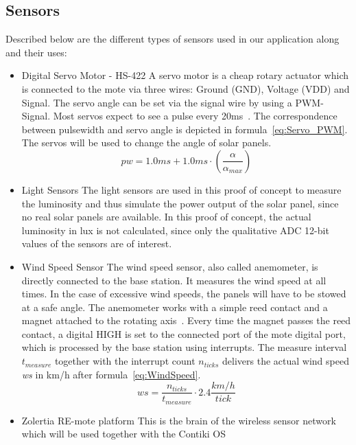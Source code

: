 \documentclass[conference]{IEEEtran}
\begin{document}
\subsection{Sensors}
Described below are the different types of sensors used in our application along and their uses:

\begin{itemize}
    \item Digital Servo Motor - HS-422\cite{servoMotor}\newline
        A servo motor is a cheap rotary actuator which is connected to the mote via three wires: Ground (GND), Voltage (VDD) and Signal. The servo angle can be set via the signal wire by using a PWM-Signal. Most servos expect to see a pulse every 20ms~\cite{howServoworks}. The correspondence between pulsewidth and servo angle is depicted in formula~\eqref{eq:Servo_PWM}. The servos will be used to change the angle of solar panels.
\begin{equation}\label{eq:Servo_PWM}
pw = 1.0ms + 1.0ms \cdot \left(\frac{\alpha}{\alpha_{max}}\right)
\end{equation}


    \item Light Sensors\cite{LightSensor}\newline
        The light sensors are used in this proof of concept to measure the luminosity and thus simulate the power output of the solar panel, since no real solar panels are available. In this proof of concept, the actual luminosity in lux is not calculated, since only the qualitative ADC 12-bit values of the sensors are of interest.
        
    \item Wind Speed Sensor\cite{WindSensor}\newline
        The wind speed sensor, also called anemometer, is directly connected to the base station. It measures the wind speed at all times. In the case of excessive wind speeds, the panels will have to be stowed at a safe angle.\newline
        The anemometer works with a simple reed contact and a magnet attached to the rotating axis~\cite{anemometer}. Every time the magnet passes the reed contact, a digital HIGH is set to the connected port of the mote digital port, which is processed by the base station using interrupts. The measure interval $t_{measure}$ together with the interrupt count $n_{ticks}$ delivers the actual wind speed \textit{ws} in km/h after formula~\eqref{eq:WindSpeed}.
        \begin{equation}\label{eq:WindSpeed}
            ws = \frac{n_{ticks}}{t_{measure}} \cdot 2.4 \dfrac{km/h}{tick}
        \end{equation}
    \item Zolertia RE-mote platform\cite{REmote}\newline
        This is the brain of the wireless sensor network which will be used together with the Contiki OS

\end{itemize}
\end{document}
